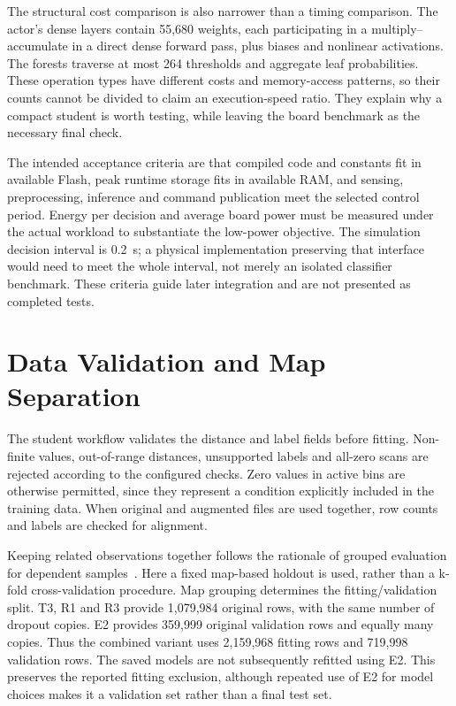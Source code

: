 The structural cost comparison is also narrower than a timing comparison.
The actor's dense layers contain 55,680 weights, each participating in a
multiply--accumulate in a direct dense forward pass, plus biases and nonlinear
activations. The forests traverse at most 264 thresholds and aggregate leaf
probabilities. These operation types have different costs and memory-access
patterns, so their counts cannot be divided to claim an execution-speed ratio.
They explain why a compact student is worth testing, while leaving the board
benchmark as the necessary final check.

The intended acceptance criteria are that compiled code and constants fit in
available Flash, peak runtime storage fits in available RAM, and sensing,
preprocessing, inference and command publication meet the selected control
period. Energy per decision and average board power must be measured under the
actual workload to substantiate the low-power objective. The simulation decision
interval is 0.2~s; a physical implementation preserving that interface would
need to meet the whole interval, not merely an isolated classifier benchmark.
These criteria guide later integration and are not presented as completed tests.

\section{Data Validation and Map Separation}
The student workflow validates the distance and label fields before fitting.
Non-finite values, out-of-range distances, unsupported labels and all-zero
scans are rejected according to the configured checks. Zero values in active
bins are otherwise permitted, since they represent a condition explicitly
included in the training data. When original and augmented files are used
together, row counts and labels are checked for alignment.

Keeping related observations together follows the rationale of grouped
evaluation for dependent samples~\cite{sklearnCV}. Here a fixed map-based
holdout is used, rather than a k-fold cross-validation procedure.
Map grouping determines the fitting/validation split. T3, R1 and R3 provide
1,079,984 original rows, with the same number of dropout copies. E2 provides
359,999 original validation rows and equally many copies. Thus the combined
variant uses 2,159,968 fitting rows and 719,998 validation rows. The saved
models are not subsequently refitted using E2. This preserves the reported
fitting exclusion, although repeated use of E2 for model choices makes it a
validation set rather than a final test set.

